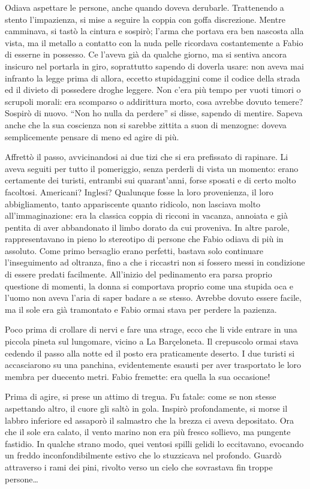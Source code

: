 Odiava aspettare le persone, anche quando doveva derubarle. Trattenendo a stento l'impazienza, si mise a seguire la coppia con goffa discrezione. Mentre camminava, si tastò la cintura e sospirò; l'arma che portava era ben nascosta alla vista, ma il metallo a contatto con la nuda pelle ricordava costantemente a Fabio di esserne in possesso. Ce l'aveva già da qualche giorno, ma si sentiva ancora insicuro nel portarla in giro, soprattutto sapendo di doverla usare: non aveva mai infranto la legge prima di allora, eccetto stupidaggini come il codice della strada ed il divieto di possedere droghe leggere. Non c'era più tempo per vuoti timori o scrupoli morali: era scomparso o addirittura morto, cosa avrebbe dovuto temere? Sospirò di nuovo. ``Non ho nulla da perdere'' si disse, sapendo di mentire. Sapeva anche che la sua coscienza non si sarebbe zittita a suon di menzogne: doveva semplicemente pensare di meno ed agire di più.

Affrettò il passo, avvicinandosi ai due tizi che si era prefissato di rapinare. Li aveva seguiti per tutto il pomeriggio, senza perderli di vista un momento: erano certamente dei turisti, entrambi sui quarant'anni, forse sposati e di certo molto facoltosi. Americani? Inglesi? Qualunque fosse la loro provenienza, il loro abbigliamento, tanto appariscente quanto ridicolo, non lasciava molto all'immaginazione: era la classica coppia di ricconi in vacanza, annoiata e già pentita di aver abbandonato il limbo dorato da cui proveniva. In altre parole, rappresentavano in pieno lo stereotipo di persone che Fabio odiava di più in assoluto. Come primo bersaglio erano perfetti, bastava solo continuare l'inseguimento ad oltranza, fino a che i riccastri non si fossero messi in condizione di essere predati facilmente. All'inizio del pedinamento era parsa proprio questione di momenti, la donna si comportava proprio come una stupida oca e l'uomo non aveva l'aria di saper badare a se stesso. Avrebbe dovuto essere facile, ma il sole era già tramontato e Fabio ormai stava per perdere la pazienza.

Poco prima di crollare di nervi e fare una strage, ecco che li vide entrare in una piccola pineta sul lungomare, vicino a La Barçeloneta. Il crepuscolo ormai stava cedendo il passo alla notte ed il posto era praticamente deserto. I due turisti si accasciarono su una panchina, evidentemente esausti per aver trasportato le loro membra per duecento metri. Fabio fremette: era quella la sua occasione!

Prima di agire, si prese un attimo di tregua. Fu fatale: come se non stesse aspettando altro, il cuore gli saltò in gola. Inspirò profondamente, si morse il labbro inferiore ed assaporò il salmastro che la brezza ci aveva depositato. Ora che il sole era calato, il vento marino non era più fresco sollievo, ma pungente fastidio. In qualche strano modo, quei ventosi spilli gelidi lo eccitavano, evocando un freddo inconfondibilmente estivo che lo stuzzicava nel profondo. Guardò attraverso i rami dei pini, rivolto verso un cielo che sovrastava fin troppe persone\ldots

